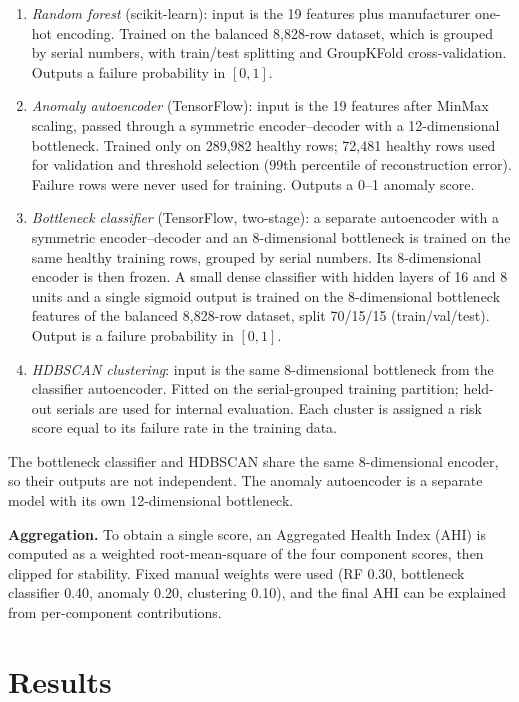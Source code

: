 \documentclass[sigconf,natbib=false]{acmart}
\begin{document}
\begin{enumerate}
    \item \emph{Random forest} (scikit-learn): input is the 19 features plus manufacturer one-hot encoding. Trained on the balanced 8{,}828-row dataset, which is grouped by serial numbers, with train/test splitting and GroupKFold cross-validation. Outputs a failure probability in $[0,1]$.
    \item \emph{Anomaly autoencoder} (TensorFlow): input is the 19 features after MinMax scaling, passed through a symmetric encoder--decoder with a 12-dimensional bottleneck. Trained only on 289{,}982 healthy rows; 72{,}481 healthy rows used for validation and threshold selection (99th percentile of reconstruction error). Failure rows were never used for training. Outputs a 0--1 anomaly score.
    \item \emph{Bottleneck classifier} (TensorFlow, two-stage): a separate autoencoder with a symmetric encoder--decoder and an 8-dimensional bottleneck is trained on the same healthy training rows, grouped by serial numbers. Its 8-dimensional encoder is then frozen. A small dense classifier with hidden layers of 16 and 8 units and a single sigmoid output is trained on the 8-dimensional bottleneck features of the balanced 8{,}828-row dataset, split 70/15/15 (train/val/test). Output is a failure probability in $[0,1]$.
    \item \emph{HDBSCAN clustering}: input is the same 8-dimensional bottleneck from the classifier autoencoder. Fitted on the serial-grouped training partition; held-out serials are used for internal evaluation. Each cluster is assigned a risk score equal to its failure rate in the training data.
\end{enumerate}

The bottleneck classifier and HDBSCAN share the same 8-dimensional encoder, so their outputs are not independent. The anomaly autoencoder is a separate model with its own 12-dimensional bottleneck.

\textbf{Aggregation.} To obtain a single score, an Aggregated Health Index (AHI) is computed as a weighted root-mean-square of the four component scores, then clipped for stability. Fixed manual weights were used (RF 0.30, bottleneck classifier 0.40, anomaly 0.20, clustering 0.10), and the final AHI can be explained from per-component contributions.

\section{Results}
\label{sec:results}
\end{document}
